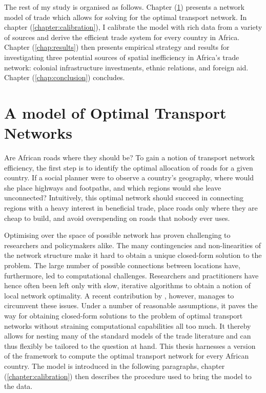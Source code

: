 \documentclass[11pt, oneside]{article}   	%
\let\oldref\ref
\renewcommand{\ref}[1]{(\oldref{#1})}
\begin{document}
The rest of my study is organised as follows. Chapter \ref{chap:model} presents a network model of trade which allows for solving for the optimal transport network. In chapter \ref{chapter:calibration}, I calibrate the model with rich data from a variety of sources and derive the efficient trade system for every country in Africa. Chapter \ref{chap:results} then presents empirical strategy and results for investigating three potential sources of spatial inefficiency in Africa's trade network: colonial infrastructure investments, ethnic relations, and foreign aid. Chapter \ref{chap:conclusion} concludes.

\section{A model of Optimal Transport Networks}
\label{chap:model}
Are African roads where they should be? To gain a notion of transport network efficiency, the first step is to identify the optimal allocation of roads for a given country. If a social planner were to observe a country's geography, where would she place highways and footpaths, and which regions would she leave unconnected? Intuitively, this optimal network should succeed in connecting regions with a heavy interest in beneficial trade, place roads only where they are cheap to build, and avoid overspending on roads that nobody ever uses.

Optimising over the space of possible network has proven challenging to researchers and policymakers alike. The many contingencies and non-linearities of the network structure make it hard to obtain a unique closed-form solution to the problem. The large number of possible connections between locations have, furthermore, led to computational challenges. Researchers and practitioners have hence often been left only with slow, iterative algorithms to obtain a notion of local network optimality. A recent contribution by \cite{fajgelbaum_optimal_2017}, however, manages to circumvent these issues. Under a number of reasonable assumptions, it paves the way for obtaining closed-form solutions to the problem of optimal transport networks without straining computational capabilities all too much. It thereby allows for nesting many of the standard models of the trade literature and can thus flexibly be tailored to the question at hand. This thesis harnesses a version of the \citeauthor{fajgelbaum_optimal_2017} framework to compute the optimal transport network for every African country. The model is introduced in the following paragraphs, chapter \ref{chapter:calibration} then describes the procedure used to bring the model to the data.
\end{document}
